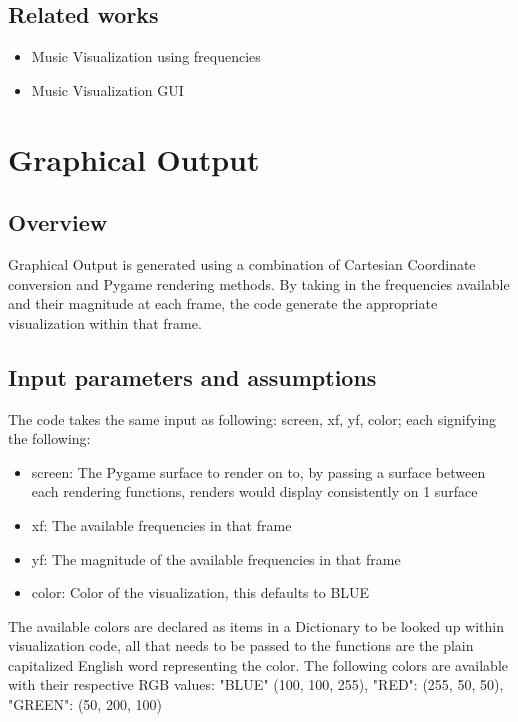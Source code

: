 \documentclass{article}
\begin{document}
\subsection{Related works}

\begin{itemize}
    \item Music Visualization using frequencies \cite{djfun}
    \item Music Visualization GUI \cite{avirzayev}
    
\end{itemize}

\section{Graphical Output}

\subsection{Overview}
Graphical Output is generated using a combination of Cartesian Coordinate conversion and Pygame rendering methods. By taking in the frequencies available and their magnitude at each frame, the code generate the appropriate visualization within that frame.

\subsection{Input parameters and assumptions}
The code takes the same input as following: screen, xf, yf, color; each signifying the following:
\begin{itemize}
    \item screen: The Pygame surface to render on to, by passing a surface between each rendering functions, renders would display consistently on 1 surface \cite{kinsley}
    \item xf: The available frequencies in that frame
    \item yf: The magnitude of the available frequencies in that frame
    \item color: Color of the visualization, this defaults to BLUE
\end{itemize}

The available colors are declared as items in a Dictionary to be looked up within visualization code, all that needs to be passed to the functions are the plain capitalized English word representing the color. The following colors are available with their respective RGB values: "BLUE" (100, 100, 255), "RED": (255, 50, 50), "GREEN": (50, 200, 100)
\end{document}
